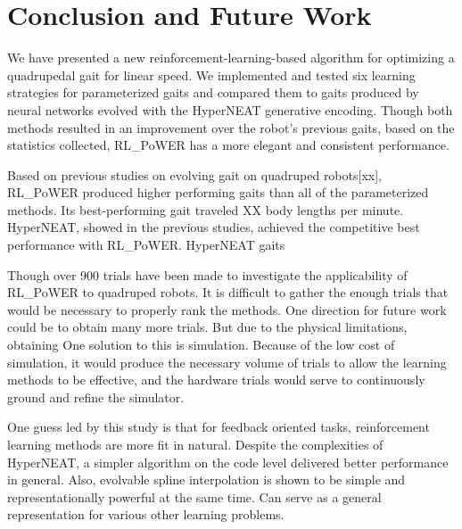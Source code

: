 \section{Conclusion and Future Work}

We have presented a new reinforcement-learning-based algorithm for
optimizing a quadrupedal gait for linear speed. We implemented and
tested six learning strategies for parameterized gaits and compared
them to gaits produced by neural networks evolved with the HyperNEAT
generative encoding. Though both methods resulted in an improvement
over the robot’s previous \naive gaits, based on the statistics
collected, RL\_PoWER has a more elegant and consistent performance.

Based on previous studies on evolving gait on quadruped robots[xx],
RL\_PoWER produced higher performing gaits than all of the
parameterized methods. Its best-performing gait traveled XX body
lengths per minute.  HyperNEAT, showed in the previous studies,
achieved the competitive best performance with RL\_PoWER. HyperNEAT
gaits

Though over 900 trials have been made to investigate the applicability
of RL\_PoWER to quadruped robots. It is difficult to gather the enough
trials that would be necessary to properly rank the methods. One
direction for future work could be to obtain many more trials. But due
to the physical limitations, obtaining One solution to this is
simulation. Because of the low cost of simulation, it would produce
the necessary volume of trials to allow the learning methods to be
effective, and the hardware trials would serve to continuously ground
and refine the simulator. \cite{glette2012evolution-of-locomotion-in-a-simulated}

One guess led by this study is that for feedback oriented tasks,
reinforcement learning methods are more fit in natural. Despite the
complexities of HyperNEAT, a simpler algorithm on the code level
delivered better performance in general.  Also, evolvable spline
interpolation is shown to be simple and representationally powerful at
the same time. Can serve as a general representation for various other
learning problems.
